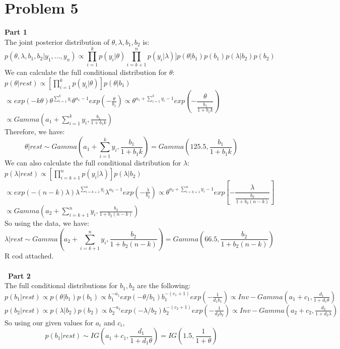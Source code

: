 \documentclass[10pt,a4paper]{article}
\begin{document}
\section*{Problem 5}
\textbf{Part 1}\\
The joint posterior distribution of $\theta,\lambda,b_1,b_2$ is:\\
$$p(\theta,\lambda,b_1,b_2|y_1,...,y_n)\propto \prod_{i=1}^{k}p(y_i|\theta) \prod_{i=k+1}^{n}p(y_i|\lambda)]p(\theta|b_1)p(b_1)p(\lambda|b_2)p(b_2)$$
We can calculate the full conditional distribution for $\theta$:\\
$ p(\theta|rest)\propto[\prod_{i=1}^{k}p(y_i|\theta)]p(\theta|b_1) $\\
$\propto exp(-k\theta)\theta^{\sum_{i=1}^{k}y_i}\theta^{a_1-1}exp(-\frac{\theta}{b_1})  \propto \theta^{a_1+\sum_{i=1}^{k}y_i-1}exp(-\dfrac{\theta}{\frac{b_1}{1+b_1k}}) $
$\propto Gamma(a_1+\sum_{i=1}^{k}y_i,\frac{b_1}{1+b_1k})$\\
Therefore, we have:\\
$$\theta|rest \sim Gamma(a_1+\sum_{i=1}^{k}y_i,\frac{b_1}{1+b_1k})=Gamma(125.5,\frac{b_1}{1+b_1k})$$
We can also calculate the full conditional distribution for $\lambda$:\\
$ p(\lambda|rest) \propto [\prod_{i=k+1}^{n}p(y_i|\lambda)]p(\lambda|b_2)$\\
$ \propto exp(-(n-k)\lambda)\lambda^{\sum_{i=k+1}^{n}y_i}\lambda^{a_2-1}exp(-\frac{\lambda}{b_2}) \propto \theta^{a_2+\sum_{i=k+1}^{n}y_i-1}exp[-\dfrac{\lambda}{\frac{b_2}{1+b_2(n-k)}}] $\\
$ \propto Gamma(a_2+\sum_{i=k+1}^{n}y_i,\frac{b_2}{1+b_2(n-k)}) $\\
So using the data, we have:\\
$$ \lambda|rest \sim Gamma(a_2+\sum_{i=k+1}^{n}y_i,\frac{b_2}{1+b_2(n-k)}) = Gamma(66.5,\frac{b_2}{1+b_2(n-k)}) $$
R cod attached. \\
\\\
\textbf{Part 2}\\
The full conditional distributions for $b_1,b_2$ are the following:\\
$p(b_1|rest)\propto p(\theta|b_1)p(b_1)\propto b_1^{-a_1}exp(-\theta/b_1)b_1^{-(c_1+1)}exp(-\frac{1}{d_1b_1})\propto Inv-Gamma(a_1+c_1,\frac{d_1}{1+d_1\theta})$
$p(b_2|rest)\propto p(\lambda|b_2)p(b_2)\propto b_2^{-a_2}exp(-\lambda/b_2)b_2^{-(c_2+1)}exp(-\frac{1}{d_2b_2})\propto Inv-Gamma(a_2+c_2,\frac{d_2}{1+d_2\lambda})$
So using our given values for $a_i$ and $c_i$,\\
$$p(b_1|rest) \sim IG(a_1+c_1,\frac{d_1}{1+d_1\theta})=IG(1.5,\frac{1}{1+\theta})$$
\end{document}
